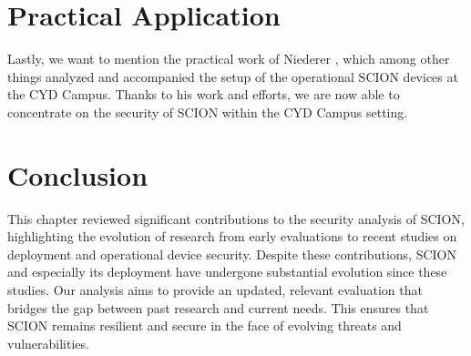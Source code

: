 \section{Practical Application}
Lastly, we want to mention the practical work of Niederer \cite{Niederer2022}, which among other things analyzed and accompanied the setup of the operational SCION devices at the CYD Campus.
Thanks to his work and efforts, we are now able to concentrate on the security of SCION within the CYD Campus setting.

\section{Conclusion}
This chapter reviewed significant contributions to the security analysis of SCION, highlighting the evolution of research from early evaluations to recent studies on deployment and operational device security.
Despite these contributions, SCION and especially its deployment have undergone substantial evolution since these studies.
Our analysis aims to provide an updated, relevant evaluation that bridges the gap between past research and current needs.
This ensures that SCION remains resilient and secure in the face of evolving threats and vulnerabilities.
